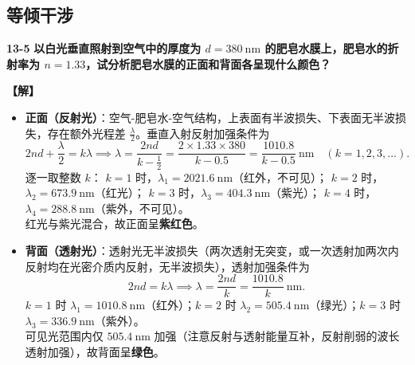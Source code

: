 \documentclass[zihao=5,a4paper,UTF8]{ctexart}
\newenvironment{prob}[2]{%
    \par\vspace{6pt}\noindent\textbf{\color{navy}#1} \textbf{#2}\par\nopagebreak\vspace{2pt}%
}{%
    \par\vspace{4pt}%
}
\newcommand{\sol}{\noindent\textbf{\color{tealaccent}【解】}\ }
\begin{document}
\subsection{等倾干涉}

\begin{prob}{13-5}{以白光垂直照射到空气中的厚度为 $d=380\ \mathrm{nm}$ 的肥皂水膜上，肥皂水的折射率为 $n=1.33$，试分析肥皂水膜的正面和背面各呈现什么颜色？}
\sol
\begin{itemize}[leftmargin=1.5em, itemsep=2pt]
    \item \textbf{正面（反射光）}：空气-肥皂水-空气结构，上表面有半波损失、下表面无半波损失，存在额外光程差 $\frac{\lambda}{2}$。垂直入射反射加强条件为
    \[
        2nd + \frac{\lambda}{2} = k\lambda \implies \lambda = \frac{2nd}{k - \frac{1}{2}} = \frac{2\times 1.33\times 380}{k - 0.5} = \frac{1010.8}{k - 0.5}\ \mathrm{nm}\quad (k=1,2,3,\dots).
    \]
    逐一取整数 $k$：
    $k=1$ 时，$\lambda_1 = 2021.6\ \mathrm{nm}$（红外，不可见）；
    $k=2$ 时，$\lambda_2 = 673.9\ \mathrm{nm}$（红光）；
    $k=3$ 时，$\lambda_3 = 404.3\ \mathrm{nm}$（紫光）；
    $k=4$ 时，$\lambda_4 = 288.8\ \mathrm{nm}$（紫外，不可见）。\\
    红光与紫光混合，故正面呈\textbf{紫红色}。
    \item \textbf{背面（透射光）}：透射光无半波损失（两次透射无突变，或一次透射加两次内反射均在光密介质内反射，无半波损失），透射加强条件为
    \[
        2nd = k\lambda \implies \lambda = \frac{2nd}{k} = \frac{1010.8}{k}\ \mathrm{nm}.
    \]
    $k=1$ 时 $\lambda_1 = 1010.8\ \mathrm{nm}$（红外）；$k=2$ 时 $\lambda_2 = 505.4\ \mathrm{nm}$（绿光）；$k=3$ 时 $\lambda_3 = 336.9\ \mathrm{nm}$（紫外）。\\
    可见光范围内仅 $505.4\ \mathrm{nm}$ 加强（注意反射与透射能量互补，反射削弱的波长透射加强），故背面呈\textbf{绿色}。
\end{itemize}
\end{prob}
\end{document}
